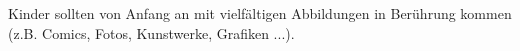 Kinder sollten von Anfang an mit vielfältigen Abbildungen in Berührung kommen (z.B. Comics, Fotos, Kunstwerke, Grafiken ...).